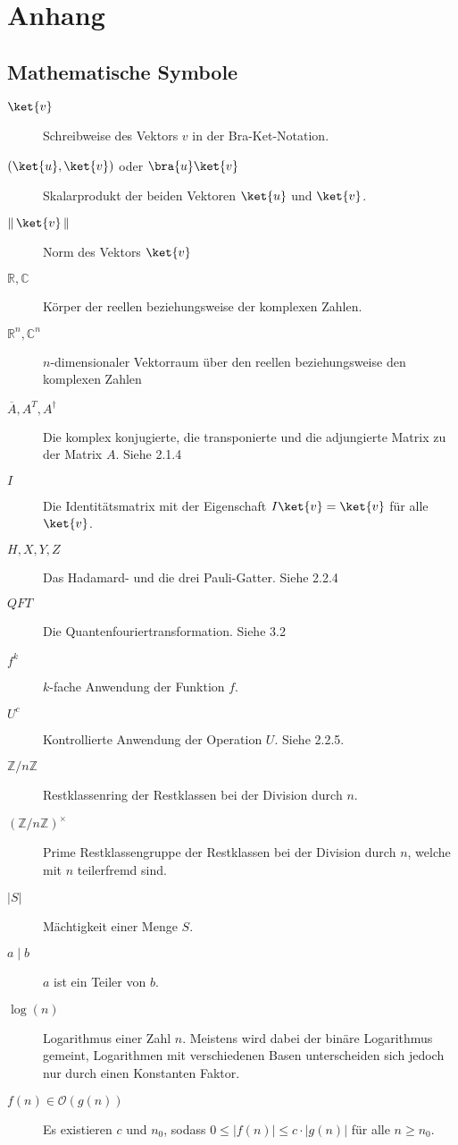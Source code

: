\chapter{Anhang}
\section{Mathematische Symbole}
\begin{description}
    \item[$\ket{v}$] Schreibweise des Vektors $v$ in der Bra-Ket-Notation.
    \item[$(\ket{u}, \ket{v})$ oder $\bra{u}\ket{v}$] Skalarprodukt der beiden Vektoren $\ket{u}$ und $\ket{v}$.
    \item[$\left\|\, \ket{v}\, \right\|$] Norm des Vektors $\ket{v}$
    \item[$\mathbb{R}, \mathbb{C}$] Körper der reellen beziehungsweise der komplexen Zahlen.
    \item[$\mathbb{R}^n, \mathbb{C}^n$] $n$-dimensionaler Vektorraum über den reellen beziehungsweise den komplexen Zahlen
    \item[$\overline{A}, A^T, A^\dagger$] Die komplex konjugierte, die transponierte und die adjungierte Matrix zu der Matrix $A$. Siehe 2.1.4
    \item[$I$] Die Identitätsmatrix mit der Eigenschaft $I\ket{v} = \ket{v}$ für alle $\ket{v}$. 
    \item[$H, X, Y, Z$] Das Hadamard- und die drei Pauli-Gatter. Siehe 2.2.4
    \item[$QFT$] Die Quantenfouriertransformation. Siehe 3.2
    \item[$f^k$] $k$-fache Anwendung der Funktion $f$.
    \item[$U^c$] Kontrollierte Anwendung der Operation $U$. Siehe 2.2.5.
    \item[$\mathbb{Z} / n \mathbb{Z}$] Restklassenring der Restklassen bei der Division durch $n$. 
    \item[$(\mathbb {Z}/n\mathbb {Z} )^{\times}$] Prime Restklassengruppe der Restklassen bei der Division durch $n$, welche mit $n$ teilerfremd sind.
    \item[$|S|$] Mächtigkeit einer Menge $S$.
    \item[$a \mid b$] $a$ ist ein Teiler von $b$.
    \item[$\log(n)$] Logarithmus einer Zahl $n$. Meistens wird dabei der binäre Logarithmus gemeint, Logarithmen mit verschiedenen Basen unterscheiden sich jedoch nur durch einen Konstanten Faktor.
    \item[$f(n) \in \mathcal O(g(n))$] Es existieren $c$ und $n_0$, sodass $0 \leq |f(n)| \leq c\cdot |g(n)|$ für alle $n\geq n_0$.
\end{description}
\pagebreak
